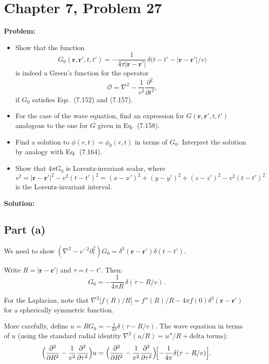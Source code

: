 \documentclass[12pt]{article}
\begin{document}
\section*{Chapter 7, Problem 27}

\textbf{Problem:}
\begin{itemize}
\item[a)] Show that the function
\[
G_0(\mathbf{r},\mathbf{r}',t,t') = -\frac{1}{4\pi|\mathbf{r}-\mathbf{r}'|}\,\delta\!\bigl(t - t' - |\mathbf{r}-\mathbf{r}'|/v\bigr)
\]
is indeed a Green's function for the operator
\[
\mathcal{O} = \nabla^2 - \frac{1}{v^2}\frac{\partial^2}{\partial t^2},
\]
if $G_0$ satisfies Eqs.\ (7.152) and (7.157).
\item[b)] For the case of the wave equation, find an expression for $G(\mathbf{r},\mathbf{r}',t,t')$ analogous to the one for $G$ given in Eq.\ (7.158).
\item[c)] Find a solution to $\phi(r,t) = \phi_0(r,t)$ in terms of $G_0$. Interpret the solution by analogy with Eq.\ (7.164).
\item[d)] Show that $4\pi G_0$ is Lorentz-invariant scalar, where
\[
s^2 = |\mathbf{r} - \mathbf{r}'|^2 - v^2(t - t')^2 = (x - x')^2 + (y-y')^2 + (z-z')^2 - v^2(t-t')^2
\]
is the Lorentz-invariant interval.
\end{itemize}

\bigskip
\textbf{Solution:}

\subsection*{Part (a)}

We need to show $(\nabla^2 - v^{-2}\partial_t^2)G_0 = \delta^3(\mathbf{r}-\mathbf{r}')\delta(t-t')$.

Write $R = |\mathbf{r}-\mathbf{r}'|$ and $\tau = t - t'$. Then:
\[
G_0 = -\frac{1}{4\pi R}\,\delta(\tau - R/v).
\]

For the Laplacian, note that $\nabla^2\bigl[f(R)/R\bigr] = f''(R)/R - 4\pi f(0)\delta^3(\mathbf{r}-\mathbf{r}')$ for a spherically symmetric function.

More carefully, define $u = RG_0 = -\frac{1}{4\pi}\delta(\tau - R/v)$. The wave equation in terms of $u$ (using the standard radial identity $\nabla^2(u/R) = u''/R + \text{delta terms}$):
\[
\Bigl(\frac{\partial^2}{\partial R^2} - \frac{1}{v^2}\frac{\partial^2}{\partial\tau^2}\Bigr)u = \Bigl(\frac{\partial^2}{\partial R^2} - \frac{1}{v^2}\frac{\partial^2}{\partial\tau^2}\Bigr)\!\Bigl[-\frac{1}{4\pi}\delta(\tau-R/v)\Bigr].
\]
\end{document}
